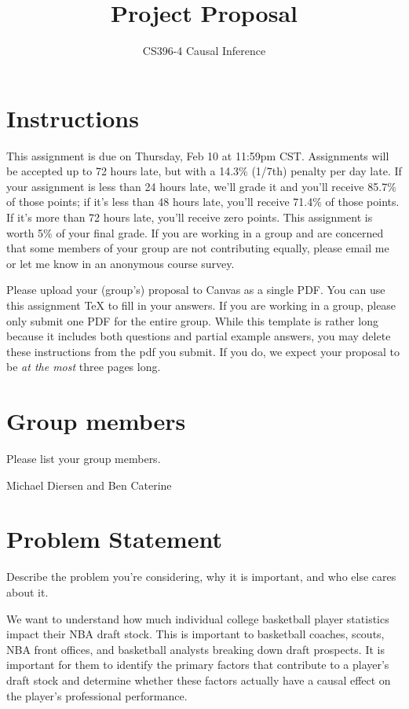 \documentclass[12pt]{article}
\title{Project Proposal \vspace{-1em}}
\author{CS396-4 Causal Inference}
\begin{document}
\maketitle

\section*{Instructions}

This assignment is due on Thursday, Feb 10 at 11:59pm CST. Assignments will be accepted up to 72 hours late, but with a 14.3\% (1/7th) penalty per day late. If your assignment is less than 24 hours late, we’ll grade it and you’ll receive 85.7\% of those points; if it’s less than 48 hours late, you’ll receive 71.4\% of those points. If it’s more than 72 hours late, you'll receive zero points. This assignment is worth 5\% of your final grade. If you are working in a group and are concerned that some members of your group are not contributing equally, please email me or let me know in an anonymous course survey.

Please upload your (group's) proposal to Canvas as a single PDF. You can use this assignment TeX to fill in your answers. If you are working in a group, please only submit one PDF for the entire group. While this template is rather long because it includes both questions and partial example answers, you may delete these instructions from the pdf you submit. If you do, we expect your proposal to be \emph{at the most} three pages long.

\section{Group members}

\noindent Please list your group members.

Michael Diersen and Ben Caterine

\section{Problem Statement}

\noindent Describe the problem you're considering, why it is important, and who else cares about it.

We want to understand how much individual college basketball player statistics impact their NBA draft stock. This is important to basketball coaches, scouts, NBA front offices, and basketball analysts breaking down draft prospects. It is important for them to identify the primary factors that contribute to a player's draft stock and determine whether these factors actually have a causal effect on the player's professional performance.
\end{document}
